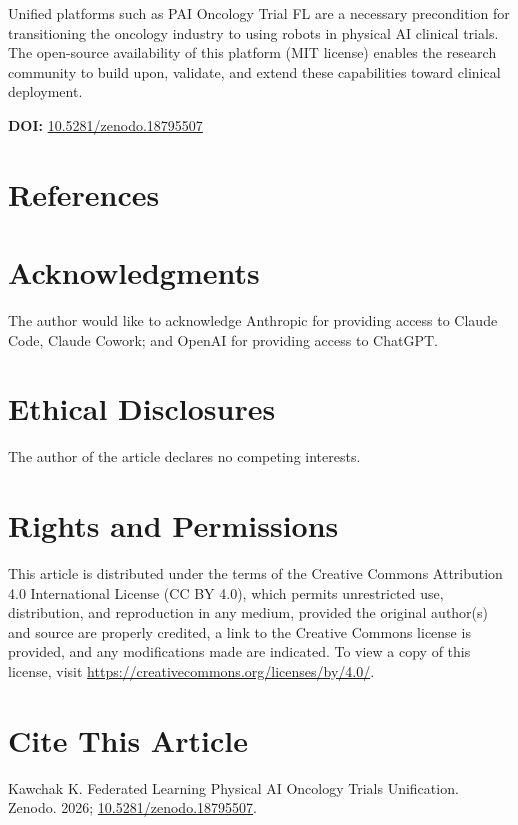 Unified platforms such as PAI Oncology Trial FL are a necessary precondition for transitioning the oncology industry to using robots in physical AI clinical trials. The open-source availability of this platform (MIT license) enables the research community to build upon, validate, and extend these capabilities toward clinical deployment.

\textbf{DOI:} \href{https://doi.org/10.5281/zenodo.18795507}{10.5281/zenodo.18795507}

\section*{References}




\section*{Acknowledgments}

The author would like to acknowledge Anthropic for providing access to Claude Code, Claude Cowork; and OpenAI for providing access to ChatGPT.

\section*{Ethical Disclosures}

The author of the article declares no competing interests.

\section*{Rights and Permissions}

This article is distributed under the terms of the Creative Commons Attribution 4.0 International License (CC BY 4.0), which permits unrestricted use, distribution, and reproduction in any medium, provided the original author(s) and source are properly credited, a link to the Creative Commons license is provided, and any modifications made are indicated. To view a copy of this license, visit \url{https://creativecommons.org/licenses/by/4.0/}.

\section*{Cite This Article}

Kawchak K. Federated Learning Physical AI Oncology Trials Unification. Zenodo. 2026; \href{https://doi.org/10.5281/zenodo.18795507}{10.5281/zenodo.18795507}.


